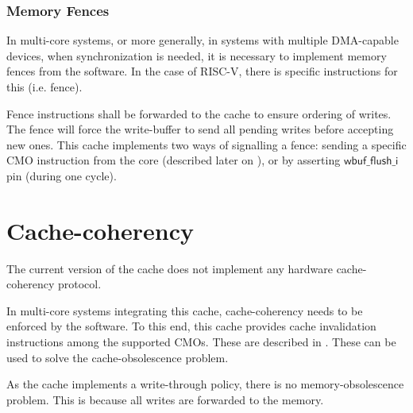 \documentclass[10pt,titlepage,twoside]{book}
\begin{document}

\subsubsection{Memory Fences}

In multi-core systems, or more generally, in systems with multiple \acs{DMA}-capable devices, when synchronization is needed, it is necessary to implement memory fences from the software.
In the case of RISC-V, there is specific instructions for this (i.e. fence).

Fence instructions shall be forwarded to the cache to ensure ordering of writes. The fence will force the write-buffer to send all pending writes before accepting new ones.
This cache implements two ways of signalling a fence: sending a specific \ac{CMO} instruction from the core (described later on ), or by asserting $\mathsf{wbuf\_flush\_i}$ pin (during one cycle).


\section{Cache-coherency}

The current version of the cache does not implement any hardware cache-coherency protocol.

In multi-core systems integrating this cache, cache-coherency needs to be enforced by the software. To this end, this cache provides cache invalidation instructions among the supported \acp{CMO}. These are described in . These can be used to solve the cache-obsolescence problem.

As the cache implements a write-through policy, there is no memory-obsolescence problem. This is because all writes are forwarded to the memory.



\end{document}
